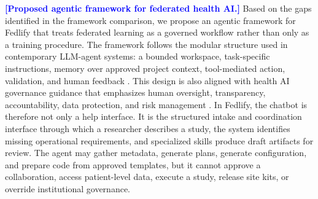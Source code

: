 \documentclass[preprint,5p, 10pt, times]{elsarticle}
\begin{document}
\textcolor{blue}{\textbf{[Proposed agentic framework for federated health AI.]}}
Based on the gaps identified in the framework comparison, we propose an agentic framework for Fedlify that treats federated learning as a governed workflow rather than only as a training procedure. 
The framework follows the modular structure used in contemporary LLM-agent systems: a bounded workspace, task-specific instructions, memory over approved project context, tool-mediated action, validation, and human feedback \cite{wang2024surveyagents,yao2023react,schick2023toolformer}. 
This design is also aligned with health AI governance guidance that emphasizes human oversight, transparency, accountability, data protection, and risk management \cite{who2021ethicsaihealth,nist2023airmf}. 
In Fedlify, the chatbot is therefore not only a help interface. It is the structured intake and coordination interface through which a researcher describes a study, the system identifies missing operational requirements, and specialized skills produce draft artifacts for review. 
The agent may gather metadata, generate plans, generate configuration, and prepare code from approved templates, but it cannot approve a collaboration, access patient-level data, execute a study, release site kits, or override institutional governance.
\end{document}
